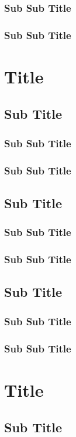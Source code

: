 \documentclass[12pt,a4paper,oneside]{article}
\begin{document}
\subsubsection{Sub Sub Title}
\lipsum[1]
\subsubsection{Sub Sub Title}
\lipsum[1]
\newpage
\section{Title}
\subsection{Sub Title}
\subsubsection{Sub Sub Title}
\lipsum[1]
\subsubsection{Sub Sub Title}
\lipsum[1]
\subsection{Sub Title}
\subsubsection{Sub Sub Title}
\lipsum[1]
\subsubsection{Sub Sub Title}
\lipsum[1]
\subsection{Sub Title}
\subsubsection{Sub Sub Title}
\lipsum[1]
\subsubsection{Sub Sub Title}
\lipsum[1]
\newpage
\section{Title}
\subsection{Sub Title}
\end{document}
